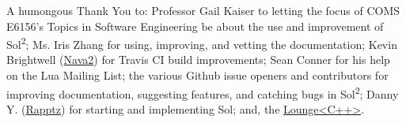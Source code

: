 \documentclass[conference,compsoc]{IEEEtran}
\newcommand{\loungecxx}{Lounge\textless{}C++\textgreater{}}
\newcommand{\soltwo}{Sol\textsuperscript{2}}
\begin{document}
A humongous Thank You to: Professor Gail Kaiser to letting the focus of COMS E6156's Topics in Software Engineering be about the use and improvement of \soltwo{}; Ms. Iris Zhang for using, improving, and vetting the documentation; Kevin Brightwell (\href{https://github.com/Nava2}{Nava2}) for Travis CI build improvements; Sean Conner for his help on the Lua Mailing List; the various Github issue openers and contributors for improving documentation, suggesting features, and catching bugs in \soltwo{}; Danny Y. (\href{https://github.com/Rapptz}{Rapptz}) for starting and implementing Sol; and, the \href{http://loungecpp.net/}{\loungecxx{}}.






%




\end{document}
